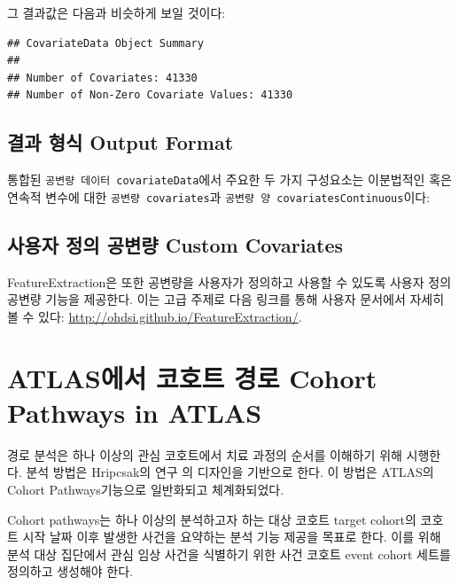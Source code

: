 \documentclass[11pt]{book}
\newenvironment{Shaded}{\begin{snugshade}}{\end{snugshade}}
\newcommand{\OperatorTok}[1]{\textcolor[rgb]{0.81,0.36,0.00}{\textbf{#1}}}
\newcommand{\NormalTok}[1]{#1}
\theoremstyle{definition}
\theoremstyle{definition}
\theoremstyle{definition}
\theoremstyle{remark}
\begin{document}
그 결과값은 다음과 비슷하게 보일 것이다:

\begin{verbatim}
## CovariateData Object Summary 
## 
## Number of Covariates: 41330 
## Number of Non-Zero Covariate Values: 41330
\end{verbatim}

\subsection{결과 형식 Output Format}\label{--output-format}

통합된 \texttt{공변량\ 데이터\ covariateData}에서 주요한 두 가지
구성요소는 이분법적인 혹은 연속적 변수에 대한
\texttt{공변량\ covariates}과
\texttt{공변량\ 양\ covariatesContinuous}이다:

\begin{Shaded}
\end{Shaded}

\subsection{사용자 정의 공변량 Custom
Covariates}\label{---custom-covariates}

FeatureExtraction은 또한 공변량을 사용자가 정의하고 사용할 수 있도록
사용자 정의 공변량 기능을 제공한다. 이는 고급 주제로 다음 링크를 통해
사용자 문서에서 자세히 볼 수 있다:
\url{http://ohdsi.github.io/FeatureExtraction/}.

\section{ATLAS에서 코호트 경로 Cohort Pathways in
ATLAS}\label{atlas---cohort-pathways-in-atlas}

경로 분석은 하나 이상의 관심 코호트에서 치료 과정의 순서를 이해하기 위해
시행한다. 분석 방법은 Hripcsak의 연구 \citep{Hripcsak7329} 의 디자인을
기반으로 한다. 이 방법은 ATLAS의 Cohort Pathways기능으로 일반화되고
체계화되었다.

Cohort pathways는 하나 이상의 분석하고자 하는 대상 코호트 target
cohort의 코호트 시작 날짜 이후 발생한 사건을 요약하는 분석 기능 제공을
목표로 한다. 이를 위해 분석 대상 집단에서 관심 임상 사건을 식별하기 위한
사건 코호트 event cohort 세트를 정의하고 생성해야 한다.
\end{document}
